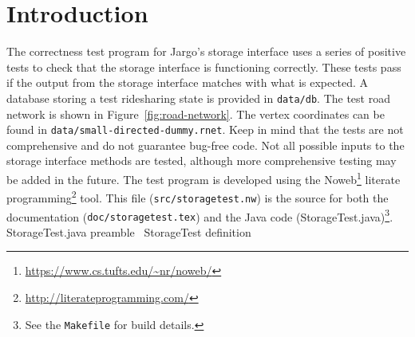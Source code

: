 \documentclass{article}
\def\nwendcode{\endtrivlist \endgroup}
\let\nwdocspar=\par
\theoremstyle{definition}
\begin{document}
\section{Introduction}
\label{sec:introduction}
The correctness test program for Jargo's storage interface uses a series of
positive tests to check that the storage interface is functioning correctly.
These tests pass if the output from the storage interface matches with what is
expected. A database storing a test ridesharing state is provided in
{\tt{}data/db}.  The test road network is shown in Figure~\ref{fig:road-network}.
The vertex coordinates can be found in {\tt{}data/small-directed-dummy.rnet}.
Keep in mind that the tests are not comprehensive and do not guarantee bug-free
code. Not all possible inputs to the storage interface methods are tested,
although more comprehensive testing may be added in the future.
The test program is developed using the
Noweb\footnote{\url{https://www.cs.tufts.edu/~nr/noweb/}} literate
programming\footnote{\url{http://literateprogramming.com/}} tool.  This file
({\tt{}src/storagetest.nw}) is the source for both the documentation
({\tt{}doc/storagetest.tex}) and the Java code (StorageTest.java)\footnote{See the
{\tt{}Makefile} for build details.}.
\endmoddef{}
  \LA{}StorageTest.java preamble~{\nwtagstyle{}}\RA{}
  \LA{}\code{}StorageTest\edoc{} definition~{\nwtagstyle{}}\RA{}
\nwendcode{}\nwdocspar
\end{document}
